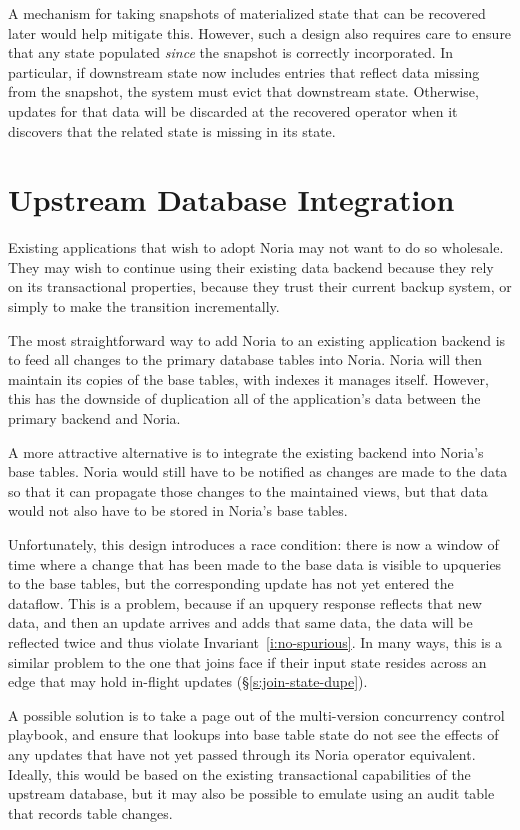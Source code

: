 A mechanism for taking snapshots of materialized state that can be recovered
later would help mitigate this. However, such a design also requires care to
ensure that any state populated \emph{since} the snapshot is correctly
incorporated. In particular, if downstream state now includes entries that
reflect data missing from the snapshot, the system must evict that downstream
state. Otherwise, updates for that data will be discarded at the recovered
operator when it discovers that the related state is missing in its state.

\section{Upstream Database Integration}

Existing applications that wish to adopt Noria may not want to do so wholesale.
They may wish to continue using their existing data backend because they rely on
its transactional properties, because they trust their current backup system, or
simply to make the transition incrementally.

The most straightforward way to add Noria to an existing application backend is
to feed all changes to the primary database tables into Noria. Noria will then
maintain its copies of the base tables, with indexes it manages itself. However,
this has the downside of duplication all of the application's data between the
primary backend and Noria.

A more attractive alternative is to integrate the existing backend into Noria's
base tables. Noria would still have to be notified as changes are made to the
data so that it can propagate those changes to the maintained views, but that
data would not also have to be stored in Noria's base tables.

Unfortunately, this design introduces a race condition: there is now a window of
time where a change that has been made to the base data is visible to upqueries
to the base tables, but the corresponding update has not yet entered the
dataflow. This is a problem, because if an upquery response reflects that new
data, and then an update arrives and adds that same data, the data will be
reflected twice and thus violate Invariant~\ref{i:no-spurious}. In many ways,
this is a similar problem to the one that joins face if their input state
resides across an edge that may hold in-flight updates
(\S\ref{s:join-state-dupe}).

A possible solution is to take a page out of the multi-version concurrency
control playbook, and ensure that lookups into base table state do not see the
effects of any updates that have not yet passed through its Noria operator
equivalent. Ideally, this would be based on the existing transactional
capabilities of the upstream database, but it may also be possible to emulate
using an audit table that records table changes.

